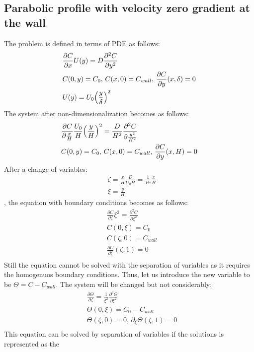 \documentclass{article}
\newcommand{\beq}{\begin{equation}}
\newcommand{\feq}{\end{equation}}
\begin{document}
\subsection{Parabolic profile with velocity zero gradient at the wall}
The problem is defined in terms of PDE as follows: 
\beq
\begin{aligned}
&\frac{\partial C}{\partial x} U(y)=D\frac{\partial^2 C}{\partial y^2}\\
&C(0,y)=C_0,\, C(x,0)=C_{wall},\, \frac{\partial C}{\partial y }(x,\delta)=0\\
&U(y)=U_0 \Bigl(\frac{y}{\delta}\Bigr)^2
\end{aligned}
\feq
The system after non-dimensionalization becomes as follows:
\beq
\begin{aligned}
&\frac{\partial C}{\partial \frac{x}{H}} \frac{U_0}{H}
\Bigl(\frac{y}{H}\Bigr)^2=\frac{D}{H^2}\frac{\partial^2 C}{\partial \frac{y^2}{H^2}}\\
&C(0,y)=C_0,\, C(x,0)=C_{wall},\, \frac{\partial C}{\partial y }(x,H)=0\\
\end{aligned}
\feq
After a change of variables:
\beq
\begin{aligned}
&\zeta=\frac{x}{H} \frac{D}{U_0 H}=\frac{1}{Pe}\frac{x}{H}\\
&\xi=\frac{y}{H}
\end{aligned}
\feq
, the equation with boundary conditions becomes as follows:
\beq
\begin{aligned}
&\frac{\partial C}{\partial \zeta}\xi^2=\frac{\partial^2 C}{\partial \xi^2}\\
&C(0,\xi)=C_0\\
&C(\zeta,0)=C_{wall}\\
&\frac{\partial C}{\partial \xi}(\zeta,1)=0\\
\end{aligned}
\feq 
Still the equation cannot be solved with the separation of variables as it requires the homogenuos
boundary conditions. Thus, let us introduce the new variable to be $\Theta=C-C_{wall}$. The system
will be changed but not considerably:
\beq
\begin{aligned}
&\frac{\partial \Theta}{\partial \zeta}=\frac{1}{\xi^2}\frac{\partial^2 \Theta}{\partial \xi^2}\\
&\Theta(0,\xi)=C_0-C_{wall}\\
&\Theta(\zeta,0)=0,\, \partial_{\xi}\Theta(\zeta,1)=0\\
\end{aligned}
\feq 
This equation can be solved by separation of variables if the solutions is represented as the
\end{document}
